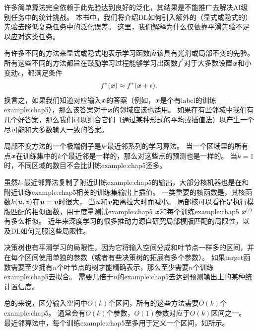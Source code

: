 许多简单算法完全依赖于此先验达到良好的泛化，其结果是不能推广去解决\gls{AI}级别任务中的统计挑战。
本书中，我们将介绍\gls{DL}如何引入额外的（显式或隐式的）先验去降低复杂任务中的泛化误差。
这里，我们解释为什么仅依靠平滑先验不足以应对这类任务。

有许多不同的方法来显式或隐式地表示学习函数应该具有光滑或局部不变的先验。
所有这些不同的方法都旨在鼓励学习过程能够学习出函数$f^*$对于大多数设置$\boldsymbol{\mathit{x}}$和小变动$\epsilon$，都满足条件
\begin{equation}
    f^*(\boldsymbol{\mathit{x}}) \approx f^*(\boldsymbol{\mathit{x}} + \epsilon).
\end{equation}
换言之，如果我们知道对应输入$\boldsymbol{\mathit{x}}$的答案（例如，$\boldsymbol{\mathit{x}}$是个有\gls{label}的训练\gls{example:chap5}），那么该答案对于$\boldsymbol{\mathit{x}}$的邻域应该也适用。
如果在有些邻域中我们有几个好答案，那么我们可以组合它们（通过某种形式的平均或插值法）以产生一个尽可能和大多数输入一致的答案。

局部不变方法的一个极端例子是$k$-最近邻系列的学习算法。
当一个区域里的所有点$\boldsymbol{\mathit{x}}$在训练集中的$k$个最近邻是一样的，那么对这些点的预测也是一样的。
当$k=1$时，不同区域的数目不会比训练\gls{example:chap5}还多。

虽然$k$-最近邻算法复制了附近训练\gls{example:chap5}的输出，大部分核机器也是在和附近训练\gls{example:chap5}相关的训练集输出上插值。
一类重要的核函数是，其核函数$k(\boldsymbol{\mathit{u}},\boldsymbol{\mathit{v}})$在$\boldsymbol{\mathit{u}}=\boldsymbol{\mathit{v}}$时很大，
当$\boldsymbol{\mathit{u}}$和$\boldsymbol{\mathit{v}}$距离拉大时而减小。
局部核可以看作是执行模版匹配的相似函数，用于度量测试\gls{example:chap5} $\boldsymbol{\mathit{x}}$和每个训练\gls{example:chap5} $\boldsymbol{\mathit{x}}^{(i)}$有多么相似。
近年来深度学习的很多推动力源自研究局部模版匹配的局限性，以及\gls{DL}如何克服这些局限性\citep{NIPS2005_424}。

决策树也有平滑学习的局限性，因为它将输入空间分成和叶节点一样多的区间，并在每个区间使用单独的参数（或者有些决策树的拓展有多个参数）。
如果\gls{target}函数需要至少拥有$n$个叶节点的树才能精确表示，那么至少需要$n$个训练\gls{example:chap5}去拟合。
需要几倍于$n$的\gls{example:chap5}去达到预测输出上的某种统计置信度。


总的来说，区分输入空间中$O(k)$个区间，所有的这些方法需要$O(k)$个\gls{example:chap5}。
通常会有$O(k)$个参数，$O(1)$参数对应于$O(k)$区间之一。
最近邻算法中，每个训练\gls{example:chap5}至多用于定义一个区间，如所示。


